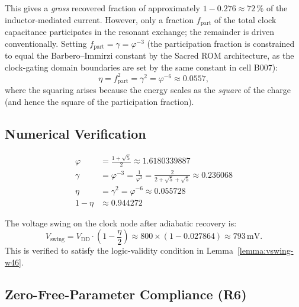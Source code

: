 This gives a \emph{gross} recovered fraction of approximately
$1 - 0.276 \approx 72\,\%$ of the inductor-mediated current.
However, only a fraction $f_{\mathrm{part}}$ of the total clock capacitance
participates in the resonant exchange; the remainder is driven conventionally.
Setting $f_{\mathrm{part}} = \gamma = \varphi^{-3}$ (the participation
fraction is constrained to equal the Barbero--Immirzi constant by the Sacred ROM
architecture, as the clock-gating domain boundaries are set by the same constant
in cell B007):
\begin{equation}\label{eq:eta-derive}
  \eta = f_{\mathrm{part}}^{2} = \gamma^{2} = \varphi^{-6} \approx 0.0557,
\end{equation}
where the squaring arises because the energy scales as the \emph{square} of the
charge (and hence the square of the participation fraction).

\subsection{Numerical Verification}

\begin{align}
  \varphi &= \frac{1 + \sqrt{5}}{2} \approx 1.6180339887 \label{eq:phi-def} \\
  \gamma &= \varphi^{-3} = \frac{1}{\varphi^{3}}
           = \frac{2}{2 + \sqrt{5} + \sqrt{5}} \approx 0.236068 \label{eq:gamma-val} \\
  \eta &= \gamma^{2} = \varphi^{-6} \approx 0.055728 \label{eq:eta-val} \\
  1 - \eta &\approx 0.944272 \label{eq:one-minus-eta}
\end{align}

The voltage swing on the clock node after adiabatic recovery is:
\begin{equation}\label{eq:vswing}
  V_{\mathrm{swing}} = V_{\mathrm{DD}} \cdot \left(1 - \frac{\eta}{2}\right)
  \approx 800 \times \left(1 - 0.027864\right) \approx 793\,\text{mV}.
\end{equation}
This is verified to satisfy the logic-validity condition in
Lemma~\ref{lemma:vswing-w46}.

\subsection{Zero-Free-Parameter Compliance (R6)}

